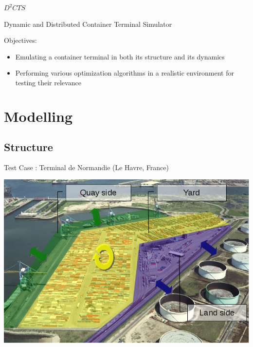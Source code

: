 \documentclass{beamer}
\begin{document}
\begin{frame}{$D^2CTS$}

  \begin{center}
Dynamic and Distributed Container Terminal Simulator\\
  \end{center}
  \begin{block}{Objectives: }
   	\begin{minipage}[]{\columnwidth}
	  \begin{itemize}
		\item Emulating a container terminal in both its structure and its dynamics\\
		\pause
		\item Performing various optimization algorithms in a realistic environment for testing their relevance\\
	  \end{itemize}
\end{minipage}
  \end{block}
\end{frame}


\section{Modelling}
  \subsection*{Structure}
 \begin{frame}{Test Case : Terminal de Normandie (Le Havre, France)}
   \begin{center}
	\includegraphics[height=.60\textheight]{fig/3zonesOfTN.png}
  \end{center}   
 \end{frame}
\end{document}
